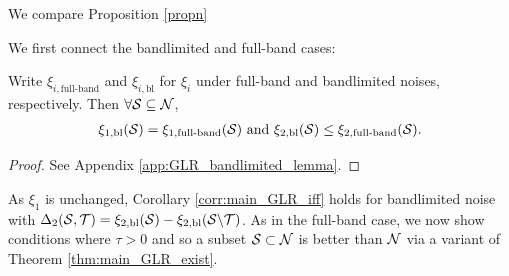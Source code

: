 {{We compare Proposition \ref{propn}

}


We first connect the bandlimited and full-band cases: %
\begin{lemma}
\label{lemma:bl_xi_2_leq_regular_xi_2}
    Write $\xi_{i, \textrm{full-band}}$ and $\xi_{i, \textrm{bl}}$ for $\xi_{i}$ under full-band and bandlimited noises, respectively. Then $\forall \mathcal{S} \subseteq \mathcal{N}$,
    \begin{align}
      \xi_{1, \textrm{bl}}(\mathcal{S}) = \xi_{1, \textrm{full-band}}(\mathcal{S}) \text{ and }
      \xi_{2, \textrm{bl}}(\mathcal{S}) \leq \xi_{2, \textrm{full-band}}(\mathcal{S}).
    \end{align}
\end{lemma}
\begin{proof}
    See Appendix \ref{app:GLR_bandlimited_lemma}.
\end{proof}
\fi

\iffalse
As $\xi_{1}$ is unchanged, Corollary \ref{corr:main_GLR_iff} holds for bandlimited noise with $\Delta_{2}(\mathcal{S},\mathcal{T}) = \xi_{2, \textrm{bl}}(\mathcal{S}) - \xi_{2, \textrm{bl}}(\mathcal{S} \backslash \mathcal{T})$. 
As in the full-band case, we now show conditions where $\tau > 0$ and so a subset $\mathcal{S} \subset \mathcal{N}$ is better than $\mathcal{N}$ via a variant of Theorem \ref{thm:main_GLR_exist}.

}
